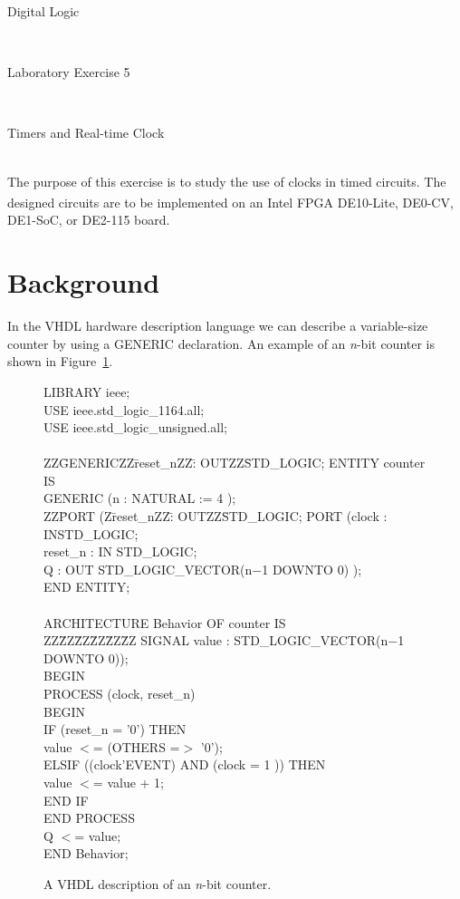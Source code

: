 \documentclass[epsfig,10pt,fullpage]{article}
\newcommand{\LabNum}{5}
\begin{document}
\centerline{\huge Digital Logic}
~\\
\centerline{\huge Laboratory Exercise \LabNum}
~\\
\centerline{\large Timers and Real-time Clock}
~\\

The purpose of this exercise is to study the use of clocks in timed circuits. The designed
circuits are to be implemented on an Intel\textsuperscript{\textregistered} FPGA DE10-Lite, DE0-CV, DE1-SoC, or DE2-115 board.

\section*{Background}
In the VHDL hardware description language we can describe a variable-size counter by 
using a GENERIC declaration. An example of an {\it n}-bit counter is shown in 
Figure~\ref{fig:n_counter}.

\begin{figure}[H]
\begin{center}
\begin{minipage}[t]{12.5 cm}
\begin{tabbing}
LIBRARY ieee;\\
USE ieee.std\_logic\_1164.all;\\
USE ieee.std\_logic\_unsigned.all;\\
~\\
ZZ\=GENERICZZ\=reset\_nZZ\=: OUTZZ\=STD\_LOGIC;\kill
ENTITY counter IS\\
\>GENERIC (\>n : NATURAL := 4 );\\
ZZ\=PORT (Z\=reset\_nZZ\=: OUTZZ\=STD\_LOGIC;\kill
\>PORT (\>clock \>: IN\>STD\_LOGIC;\\
\>\>reset\_n \>: IN \>STD\_LOGIC;\\
\>\>Q \>: OUT \>STD\_LOGIC\_VECTOR(n$-$1 DOWNTO 0) );\\
END ENTITY;\\
~\\
ARCHITECTURE Behavior OF counter IS\\
ZZ\=ZZ\=ZZ\=ZZ\=ZZ\=ZZ\kill
\>SIGNAL value : STD\_LOGIC\_VECTOR(n$-$1 DOWNTO 0));\\
BEGIN\\
\>PROCESS (clock, reset\_n)\\
\>BEGIN\\
\>\>IF (reset\_n = '0') THEN\\
\>\>\>value $<$= (OTHERS =$>$ '0');\\
\>\>ELSIF ((clock'EVENT) AND (clock = 1 )) THEN\\
\>\>\>value $<$= value + 1;\\
\>\>END IF\\
\>END PROCESS\\
\>Q $<$= value;\\
END Behavior;\\
\end{tabbing}
\end{minipage}
\end{center}
\caption{A VHDL description of an {\it n}-bit counter.}
\label{fig:n_counter}
\end{figure}
\end{document}
